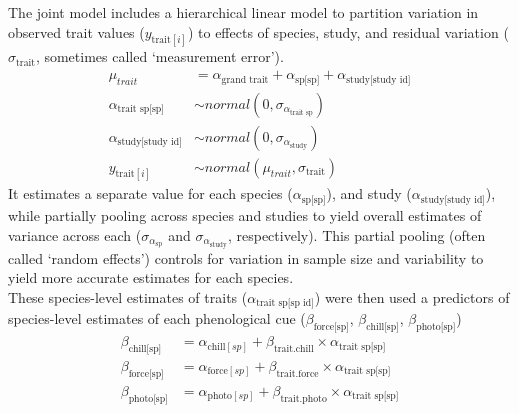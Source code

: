 \documentclass[11pt]{article}
\begin{document}
The joint model includes a hierarchical linear model to partition variation in observed trait values ($y_{\text{trait}[i]}$) to effects of species, study, and residual variation ($\sigma_{\text{trait}}$, sometimes called `measurement error').
\begin{align}
\mu_{trait} & = \alpha_{\text{grand trait}} + \alpha_{\text{sp[sp]}} + \alpha_{\text{study[study id]}}\\
\alpha_{\text{trait sp[sp]}} &  \sim normal(0, \sigma_{\alpha_{\text{trait sp}}}) \nonumber \\
\alpha_{\text{study[study id]}} & \sim normal(0,\sigma_{\alpha_{\text{study}}}) \nonumber \\
y_{\text{trait}[i]} & \sim normal( \mu_{trait}, \sigma_{\text{trait}}) \nonumber 
\end{align}
It estimates a separate value for each species ($\alpha_{\text{sp[sp]}}$), and study ($\alpha_{\text{study[study id]}}$), while partially pooling across species and studies to yield overall estimates of variance across each ($\sigma_{\alpha_{\text{sp}}}$ and $\sigma_{\alpha_{\text{study}}}$, respectively). This partial pooling (often called `random effects') controls for variation in sample size and variability to yield more accurate estimates for each species. \\

These species-level estimates of traits ($\alpha_{\text{trait sp[sp id]}}$) were then used a predictors of species-level estimates of each phenological cue ($\beta_{\text{force[sp]}}$, $\beta_{\text{chill[sp]}}$, $\beta_{\text{photo[sp]}}$) 
\begin{align}
\beta_{\text{chill[sp]}} & = \alpha_{\text{chill}[sp]} + \beta_{\text{trait}.\text{chill}} \times \alpha_{\text{trait sp[sp]}} \nonumber \\
\beta_{\text{force[sp]}} & = \alpha_{\text{force}[sp]} + \beta_{\text{trait}.\text{force}} \times \alpha_{\text{trait sp[sp]}} \\
\beta_{\text{photo[sp]}} & = \alpha_{\text{photo}[sp]} + \beta_{\text{trait}.\text{photo}} \times \alpha_{\text{trait sp[sp]}} \nonumber 
\end{align}
\end{document}
